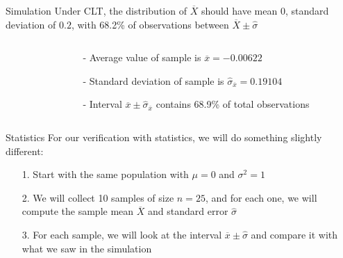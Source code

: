 \documentclass{beamer}
\begin{document}
\begin{frame}{Simulation}
Under CLT, the distribution of $\overline{X}$ should have mean $0$, standard deviation of $0.2$, with 68.2\% of observations between $\overline{X} \pm \hat{\sigma}$
\begin{columns}

  \begin{column}{0.55\textwidth}


  \end{column}
  \begin{column}{0.45\textwidth}
    \begin{itemize}
      \item[-] Average value of sample is $\overline{x} = - 0.00622$
      \item[-] Standard deviation of sample is $\hat{\sigma}_{\overline{x}} = 0.19104$
      \item[-] Interval $\overline{x} \pm \hat{\sigma}_{\overline{x}}$ contains 68.9\% of total observations

    \end{itemize}
  \end{column}

\end{columns}

\end{frame}


\begin{frame}{Statistics}
For our verification with statistics, we will do something slightly different: \vspace{3mm}

\begin{itemize}
\item[1.] Start with the same population with $\mu = 0$ and $\sigma^2 = 1$
\item[2.] We will collect 10 samples of size $n = 25$, and for each one, we will compute the sample mean $\overline{X}$ and standard error $\hat{\sigma}$
\item[3.] For each sample, we will look at the interval $\overline{x} \pm \hat{\sigma}$ and compare it with what we saw in the simulation
\end{itemize}
\end{frame}
\end{document}
